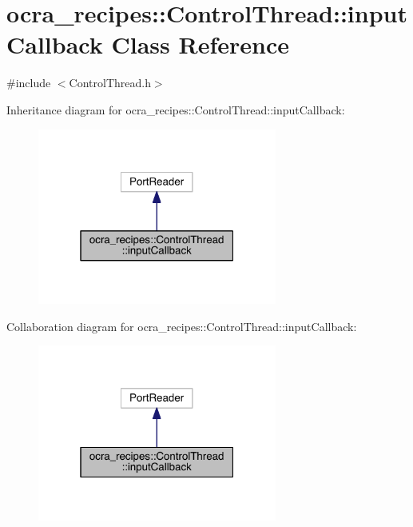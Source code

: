 \hypertarget{classocra__recipes_1_1ControlThread_1_1inputCallback}{}\section{ocra\+\_\+recipes\+:\+:Control\+Thread\+:\+:input\+Callback Class Reference}
\label{classocra__recipes_1_1ControlThread_1_1inputCallback}


{\ttfamily \#include $<$Control\+Thread.\+h$>$}



Inheritance diagram for ocra\+\_\+recipes\+:\+:Control\+Thread\+:\+:input\+Callback\+:\nopagebreak
\begin{figure}[H]
\begin{center}
\leavevmode
\includegraphics[width=223pt]{dd/dec/classocra__recipes_1_1ControlThread_1_1inputCallback__inherit__graph}
\end{center}
\end{figure}


Collaboration diagram for ocra\+\_\+recipes\+:\+:Control\+Thread\+:\+:input\+Callback\+:\nopagebreak
\begin{figure}[H]
\begin{center}
\leavevmode
\includegraphics[width=223pt]{d5/d6b/classocra__recipes_1_1ControlThread_1_1inputCallback__coll__graph}
\end{center}
\end{figure}
